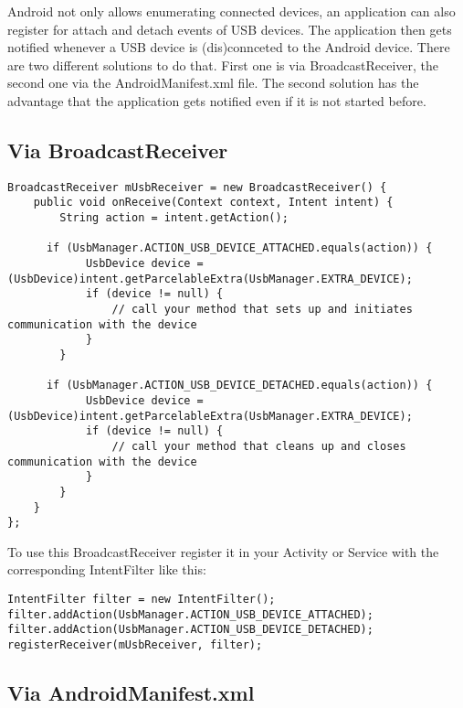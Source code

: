 Android not only allows enumerating connected devices, an application can also register for attach and detach events of USB devices. The application then gets notified whenever a USB device is (dis)connceted to the Android device. There are two different solutions to do that. First one is via BroadcastReceiver, the second one via the AndroidManifest.xml file. The second solution has the advantage that the application gets notified even if it is not started before.

\subsection{Via BroadcastReceiver}

\begin{lstlisting}[caption=Attach and detach notification of USB devices via BroadcastReceivers, label=listing:attach_broadcast]
BroadcastReceiver mUsbReceiver = new BroadcastReceiver() {
    public void onReceive(Context context, Intent intent) {
        String action = intent.getAction(); 

      if (UsbManager.ACTION_USB_DEVICE_ATTACHED.equals(action)) {
            UsbDevice device = (UsbDevice)intent.getParcelableExtra(UsbManager.EXTRA_DEVICE);
            if (device != null) {
                // call your method that sets up and initiates communication with the device
            }
        }

      if (UsbManager.ACTION_USB_DEVICE_DETACHED.equals(action)) {
            UsbDevice device = (UsbDevice)intent.getParcelableExtra(UsbManager.EXTRA_DEVICE);
            if (device != null) {
                // call your method that cleans up and closes communication with the device
            }
        }
    }
};
\end{lstlisting}

To use this BroadcastReceiver register it in your Activity or Service with the corresponding IntentFilter like this:

\begin{lstlisting}[caption=Register the BroadcastReceiver with the desired actions, label=listing:attach_register]
IntentFilter filter = new IntentFilter();
filter.addAction(UsbManager.ACTION_USB_DEVICE_ATTACHED);
filter.addAction(UsbManager.ACTION_USB_DEVICE_DETACHED);
registerReceiver(mUsbReceiver, filter);
\end{lstlisting}

\subsection{Via AndroidManifest.xml}

